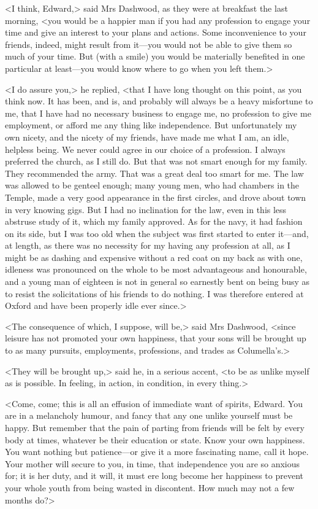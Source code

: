 <I think, Edward,> said Mrs Dashwood, as they were at breakfast the last morning, <you would be a happier man if you had any profession to engage your time and give an interest to your plans and actions. Some inconvenience to your friends, indeed, might result from it—you would not be able to give them so much of your time. But (with a smile) you would be materially benefited in one particular at least—you would know where to go when you left them.>

<I do assure you,> he replied, <that I have long thought on this point, as you think now. It has been, and is, and probably will always be a heavy misfortune to me, that I have had no necessary business to engage me, no profession to give me employment, or afford me any thing like independence. But unfortunately my own nicety, and the nicety of my friends, have made me what I am, an idle, helpless being. We never could agree in our choice of a profession. I always preferred the church, as I still do. But that was not smart enough for my family. They recommended the army. That was a great deal too smart for me. The law was allowed to be genteel enough; many young men, who had chambers in the Temple, made a very good appearance in the first circles, and drove about town in very knowing gigs. But I had no inclination for the law, even in this less abstruse study of it, which my family approved. As for the navy, it had fashion on its side, but I was too old when the subject was first started to enter it—and, at length, as there was no necessity for my having any profession at all, as I might be as dashing and expensive without a red coat on my back as with one, idleness was pronounced on the whole to be most advantageous and honourable, and a young man of eighteen is not in general so earnestly bent on being busy as to resist the solicitations of his friends to do nothing. I was therefore entered at Oxford and have been properly idle ever since.>

<The consequence of which, I suppose, will be,> said Mrs Dashwood, <since leisure has not promoted your own happiness, that your sons will be brought up to as many pursuits, employments, professions, and trades as Columella's.>

<They will be brought up,> said he, in a serious accent, <to be as unlike myself as is possible. In feeling, in action, in condition, in every thing.>

<Come, come; this is all an effusion of immediate want of spirits, Edward. You are in a melancholy humour, and fancy that any one unlike yourself must be happy. But remember that the pain of parting from friends will be felt by every body at times, whatever be their education or state. Know your own happiness. You want nothing but patience—or give it a more fascinating name, call it hope. Your mother will secure to you, in time, that independence you are so anxious for; it is her duty, and it will, it must ere long become her happiness to prevent your whole youth from being wasted in discontent. How much may not a few months do?>

